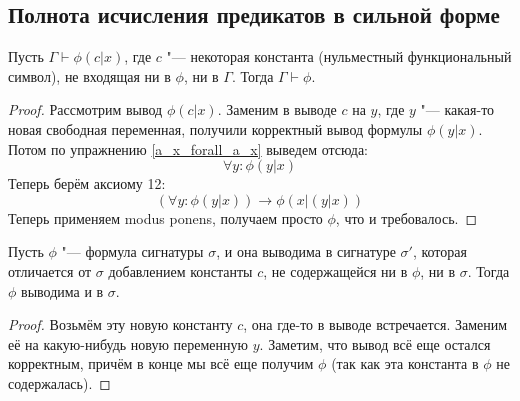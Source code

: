 \subsection{Полнота исчисления предикатов в сильной форме}
\begin{lemma}\label{fresh_const_lemma}
	Пусть $\Gamma \vdash \phi(c|x)$, где $c$ "--- некоторая константа (нульместный функциональный символ), не входящая ни в $\phi$, ни в $\Gamma$.
	Тогда $\Gamma \vdash \phi$.
\end{lemma}
\begin{proof}
	Рассмотрим вывод $\phi(c|x)$.
	Заменим в выводе $c$ на $y$, где $y$ "--- какая-то новая свободная переменная, получили корректный вывод формулы $\phi(y|x)$.
	Потом по упражнению \ref{a_x_forall_a_x} выведем отсюда:
	\[ \forall y \colon \phi(y|x) \]
	Теперь берём аксиому 12:
	\[ (\forall y \colon \phi(y|x)) \to \phi(x|(y|x)) \]
	Теперь применяем modus ponens, получаем просто $\phi$, что и требовалось.
\end{proof}

\begin{lemma}
	Пусть $\phi$ "--- формула сигнатуры $\sigma$, и она выводима в сигнатуре $\sigma'$, которая отличается от $\sigma$ добавлением константы $c$,
	не содержащейся ни в $\phi$, ни в $\sigma$.
	Тогда $\phi$ выводима и в $\sigma$.
\end{lemma}
\begin{proof}
	Возьмём эту новую константу $c$, она где-то в выводе встречается.
	Заменим её на какую-нибудь новую переменную $y$.
	Заметим, что вывод всё еще остался корректным, причём в конце мы всё еще получим $\phi$
	(так как эта константа в $\phi$ не содержалась).
\end{proof}

